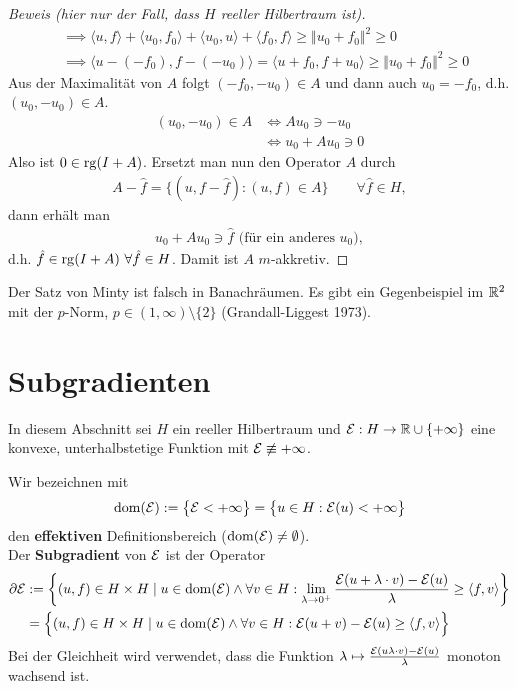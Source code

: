 \begin{proof}[Beweis (hier nur der Fall, dass $H$ reeller Hilbertraum ist)]
\begin{align*}
		&\implies
		\langle u,f\rangle +\langle u_0,f_0\rangle+\langle u_0,u\rangle+\langle f_0,f\rangle\geq\Vert u_0+f_0\Vert^2\geq0\\
		&\implies
		\big\langle u-(-f_0),f-(-u_0)\big\rangle=
		\big\langle u+f_0,f+u_0\big\rangle\geq\big\Vert u_0+f_0\Vert^2\geq0
	\end{align*}
	Aus der Maximalität von $A$ folgt $(-f_0,-u_0)\in A$ und dann auch $u_0=-f_0$, d.h.\\ $(u_0,-u_0)\in A$.
	\begin{align*}
		(u_0,-u_0)\in A
		&\Longleftrightarrow Au_0\ni -u_0\\
		&\Longleftrightarrow u_0+Au_0\ni 0
	\end{align*}
	Also ist $0\in\operatorname{rg}(I+A)$. 
	Ersetzt man nun den Operator $A$ durch
	\begin{align*}
		A-\hat{f}=\big\lbrace(u,f-\hat{f}):(u,f)\in A\big\rbrace\qquad\forall \hat{f}\in H,
	\end{align*}
	dann erhält man
	\begin{align*}
		u_0+Au_0\ni\hat{f}\text{ (für ein anderes $u_0$)},
	\end{align*}
	d.h. $\hat{f}\in\operatorname{rg}(I+A)~\forall\hat{f}\in H$. 
	Damit ist $A$ $m$-akkretiv.
\end{proof}

\begin{bemerkung}
	Der Satz von Minty ist falsch in Banachräumen. 
	Es gibt ein Gegenbeispiel im $\mathbb{R}^2$ mit der $p$-Norm, $p\in(1,\infty)\setminus\lbrace2\rbrace$ (Grandall-Liggest 1973).
\end{bemerkung}

\section{Subgradienten}
In diesem Abschnitt sei $H$ ein reeller Hilbertraum und $\mathcal{E}:H\to\mathbb{R}\cup\lbrace+\infty\rbrace$ eine konvexe, unterhalbstetige Funktion mit $\mathcal{E}\not\equiv+\infty$. 
\begin{definition}
	Wir bezeichnen mit
	\begin{align*}
		\operatorname{dom}(\mathcal{E}):=\big\lbrace\mathcal{E}<+\infty\big\rbrace=\big\lbrace u\in H:\mathcal{E}(u)<+\infty\big\rbrace
	\end{align*}
	den \textbf{effektiven} Definitionsbereich ($\operatorname{dom}(\mathcal{E})\neq\emptyset$).\\
	Der \textbf{Subgradient} von $\mathcal{E}$ ist der Operator
	\begin{align*}
		\partial\mathcal{E}&:=\left\lbrace (u,f)\in H\times H\mid u\in\operatorname{dom}(\mathcal{E})\wedge\forall v\in H:\lim\limits_{\lambda\to0^+}\frac{\mathcal{E}(u+\lambda\cdot v)-\mathcal{E}(u)}{\lambda}\geq\langle f,v\rangle\right\rbrace\\
		&=\Big\lbrace(u,f)\in H\times H\mid u\in\operatorname{dom}(\mathcal{E})\wedge\forall v\in H:\mathcal{E}(u+v)-\mathcal{E}(u)\geq\langle f,v\rangle\Big\rbrace
	\end{align*}
	Bei der Gleichheit wird verwendet, dass die Funktion $\lambda\mapsto\frac{\mathcal{E}(u\lambda\cdot v)-\mathcal{E}(u)}{\lambda}$ monoton wachsend ist.
\end{definition}

